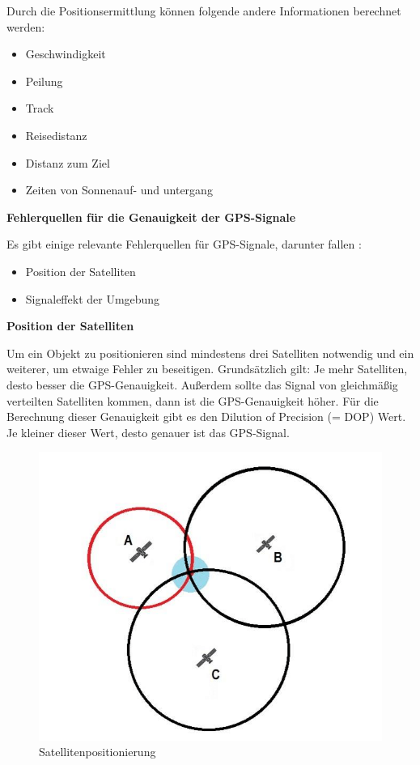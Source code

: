 Durch die Positionsermittlung können folgende andere Informationen berechnet werden:

\begin{itemize}
	\item Geschwindigkeit
	\item Peilung
	\item Track
	\item Reisedistanz
	\item Distanz zum Ziel
	\item Zeiten von Sonnenauf- und untergang
\end{itemize}

\textbf{Fehlerquellen für die Genauigkeit der GPS-Signale}

Es gibt einige relevante Fehlerquellen für GPS-Signale, darunter fallen \parencite{GPSFehlerquellen}:
\begin{itemize}
	\item Position der Satelliten
	\item Signaleffekt der Umgebung
\end{itemize}


\textbf{Position der Satelliten}

Um ein Objekt zu positionieren sind mindestens drei Satelliten notwendig und ein weiterer, um etwaige Fehler zu beseitigen. Grundsätzlich gilt: Je mehr Satelliten, desto besser die GPS-Genauigkeit. Außerdem sollte das Signal von gleichmäßig verteilten Satelliten kommen, dann ist die GPS-Genauigkeit höher. Für die Berechnung dieser Genauigkeit gibt es den Dilution of Precision (= DOP) Wert.  Je kleiner dieser Wert, desto genauer ist das GPS-Signal.
\begin{figure}[H]
	\centering
	\includegraphics[width=0.7\linewidth]{images/Satellitenposition.jpg}
	\caption[Satellitenpositionierung]{Satellitenpositionierung}
	\label{fig:Satellitenposition}
\end{figure}

